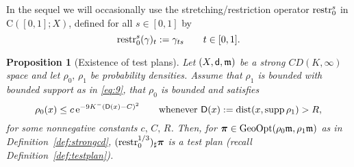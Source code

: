 \documentclass[reqno,11pt]{article}
\numberwithin{equation}{section}
\newcommand{\mm}{{\mbox{\boldmath$m$}}}
\newcommand{\ppi}{{\mbox{\boldmath$\pi$}}}
\newcommand{\sfd}{{\sf d}}
\newcommand{\sfD}{{\sf D}}
\newcommand{\rme}{{\mathrm e}}
\newcommand{\supp}{\mathop{\rm supp}\nolimits}   %
\newtheorem{proposition}[theorem]{Proposition}
\newcommand{\gopt}{{\rm{GeoOpt}}}                   %
\newcommand{\CC}[2]{\mathrm{C}(#1;#2)}
\renewcommand{\mm}{\mathfrak m}
\begin{document}
In the sequel we will occasionally use the stretching/restriction
operator ${\rm restr}_0^s$ in $\CC{[0,1]}X$, defined for all $s\in
[0,1]$ by
$$
{\rm restr}_0^s(\gamma)_t:=\gamma_{ts}\qquad t\in [0,1].
$$
\begin{proposition}[Existence of test plans]\label{prop:testplan}
Let $(X,\sfd,\mm)$ be a strong $CD(K,\infty)$ space and let
$\rho_0,\,\rho_1$ be probability densities. Assume that $\rho_1$ is
bounded with bounded support as in \eqref{eq:9}, that $\rho_0$ is
bounded and satisfies
\begin{equation}\label{eq:boundrho0}
\rho_0(x)\leq c\,\rme^{-9K^-(\sfD(x)-C)^2}\qquad\text{whenever
$\sfD(x):=\mathrm{dist}(x,\supp\rho_1)>R$},
\end{equation}
for some nonnegative constants $c,\,C,\,R$. Then,  for
$\ppi\in\gopt(\rho_0\mm,\rho_1\mm)$ as in
Definition~\ref{def:strongcd}, $({\rm restr}_0^{1/3})_\sharp\ppi$ is
a test plan (recall Definition~\ref{def:testplan}).
\end{proposition}
\end{document}
